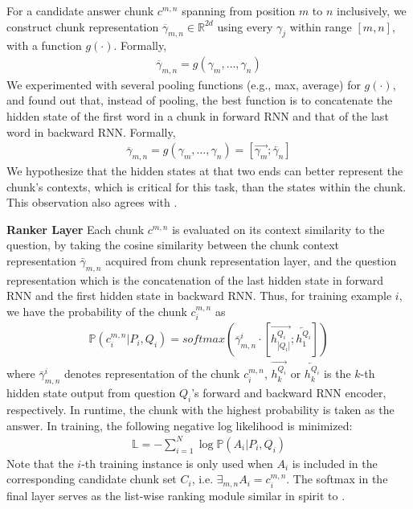 \documentclass[letterpaper]{article}
\begin{document}
For a candidate answer chunk $c^{m,n}$ spanning from position $m$ to $n$ inclusively, we construct chunk representation $\overline \gamma_{m,n} \in \mathbb{R}^{2d}$ using every $\gamma_j$ within range $[m,n]$, with a function $g(\cdot)$. Formally,
\begin{eqnarray}
\overline \gamma_{m,n}=g(\gamma_m, \dots, \gamma_n) \nonumber
\end{eqnarray}
We experimented with several pooling functions (e.g., max, average) for $g(\cdot)$, and found out that, instead of pooling, the best function is to concatenate the hidden state of the first word in a chunk in forward RNN and that of the last word in backward RNN. Formally,
\begin{eqnarray}
\overline \gamma_{m,n}=g(\gamma_{m}, \dots, \gamma_{n}) = [\overrightarrow{\gamma_{m}} ; \overleftarrow{\gamma_{n}}]
\end{eqnarray}
We hypothesize that the hidden states at that two ends can better represent the chunk's contexts, which is critical for this task, than the states within the chunk. This observation also agrees with \cite{kobayashi2016dynamic}.






\noindent\textbf{Ranker Layer}
Each chunk $c^{m,n}$ is evaluated on its context similarity to the question, by taking the cosine similarity between the chunk context representation $\bar\gamma_{m,n}$ acquired from chunk representation layer, and the question representation which is the concatenation of the last hidden state in forward RNN and the first hidden state in backward RNN. Thus, for training example $i$, we have the probability of the chunk $c^{m,n}_i$ as
\begin{eqnarray}
\mathbb{P}(c^{m,n}_i|P_i, Q_i) = softmax(\overline \gamma^i_{m,n} \cdot [\overrightarrow{h^{Q_i}_{|Q_i|}} ; \overleftarrow{h^{Q_i}_1}])
\end{eqnarray}
where $\bar\gamma^i_{m,n}$ denotes representation of the chunk $c^{m,n}_i$, $\overrightarrow{h^{Q_i}_k}$ or $\overleftarrow{h^{Q_i}_k}$ is the $k$-th hidden state output from question $Q_i$'s forward and backward RNN encoder, respectively. In runtime, the chunk with the highest probability is taken as the answer. In training, the following negative log likelihood is minimized:
\begin{eqnarray}
\mathbb{L} = -\sum_{i=1}^N \log\mathbb{P}(A_i|P_i, Q_i)
\end{eqnarray}
Note that the $i$-th training instance is only used when $A_i$ is included in the corresponding candidate chunk set $C_i$, i.e. $\exists_{m,n} A_i = c^{m,n}_i$.
The softmax in the final layer serves as the list-wise ranking module similar in spirit to \cite{cao2007learning}.
\end{document}
